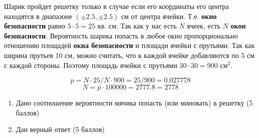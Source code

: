 \solutionSection
Шарик пройдет решетку только в случае если его координаты его центра находятся в диапазоне $(\pm 2.5, \pm 2.5)$ см от центра ячейки. Т.е. \textbf{окно безопасности} равно $5\cdot 5 = 25$ кв. см. Так как у нас есть $N$ ячеек, есть $N$ \textbf{окон безопасности}. Вероятность шарика попасть в любое окно пропорционально отношению площадей \textbf{окна безопасности} и площади ячейки с прутьями. Так как ширина прутьев 10 см, можно считать, что к каждой ячейке добавляются по 5 см с каждой стороны. Поэтому площадь ячейки с прутьями $30\cdot 30 = 900$ см$^2$. 

\[p = N \cdot  25 / N \cdot  900 = 25 / 900 = 0.027778\]
\[N = p \cdot  100000  = 2777.8 = 2778\]


\markSection

\begin{enumerate}
    \item Дано соотношение вероятности мячика попасть (или миновать) в решетку (5 баллов)
    \item Дан верный ответ (5 баллов)
\end{enumerate}